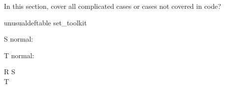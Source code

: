 \documentclass{article}
\begin{document}
In this section, cover all complicated cases or cases not covered in code?
\begin{zsection}
\SECTION unusualdeftable \parents set\_toolkit
\end{zsection}


\begin{zed}
   [X]
\end{zed}

\begin{schema}{S}
   normal: \nat
\end{schema}

\begin{schema}{T}
   normal: \arithmos
\end{schema}

\begin{schema}{R}
   S \\
   T
\end{schema}




\end{document}
